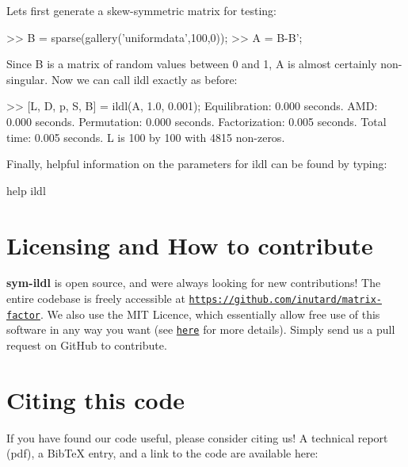 Let\textquotesingle{}s first generate a skew-\/symmetric matrix for testing\+: \begin{DoxyParagraph}{}

\begin{DoxyCode}
>> B = sparse(gallery(\textcolor{stringliteral}{'uniformdata'},100,0));
>> A = B-B\textcolor{stringliteral}{';}
\end{DoxyCode}

\end{DoxyParagraph}
Since B is a matrix of random values between 0 and 1, A is almost certainly non-\/singular. Now we can call {\ttfamily ildl} exactly as before\+: \begin{DoxyParagraph}{}

\begin{DoxyCode}
>> [L, D, p, S, B] = ildl(A, 1.0, 0.001);
Equilibration:  0.000 seconds.
AMD:            0.000 seconds.
Permutation:    0.000 seconds.
Factorization:  0.005 seconds.
Total time:     0.005 seconds.
L is 100 by 100 with 4815 non-zeros.
\end{DoxyCode}

\end{DoxyParagraph}
Finally, helpful information on the parameters for {\ttfamily ildl} can be found by typing\+: 
\begin{DoxyCode}
help ildl
\end{DoxyCode}
\hypertarget{index_contribute_sec}{}\section{Licensing and How to contribute}\label{index_contribute_sec}
{\bfseries sym-\/ildl} is open source, and we\textquotesingle{}re always looking for new contributions! The entire codebase is freely accessible at \href{https://github.com/inutard/matrix-factor}{\tt https\+://github.\+com/inutard/matrix-\/factor}. We also use the M\+IT Licence, which essentially allow free use of this software in any way you want (see \href{http://opensource.org/licenses/MIT}{\tt here} for more details). Simply send us a pull request on Git\+Hub to contribute.\hypertarget{index_citations}{}\section{Citing this code}\label{index_citations}
If you have found our code useful, please consider citing us! A technical report (pdf), a Bib\+TeX entry, and a link to the code are available here\+:

